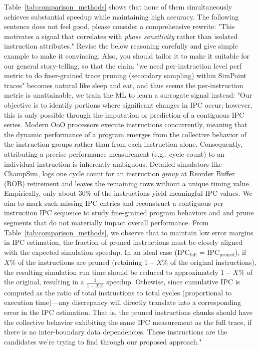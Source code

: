 Table~\ref{tab:comparison_methods} shows that none of them simultaneously achieves substantial speedup while maintaining high accuracy. The following sentence does not feel good, please consider a comprehensive rewrite: "This motivates a signal that correlates with \emph{phase sensitivity} rather than isolated instruction attributes."
Revise the below reasoning carefully and give simple example to make it convincing. Also, you should tailor it to make it suitable for our general story-telling, so that the claim "we need per-instruction level perf metric to do finer-grained trace pruning (secondary sampling) within SimPoint traces" becomes natural like sleep and eat, and thus seems the per-instruction metric is unattainable, we train the ML to learn a surrogate signal instead: "Our objective is to identify portions where significant changes in IPC occur; however, this is only possible through the imputation or prediction of a contiguous IPC series. Modern OoO processors execute instructions concurrently, meaning that the dynamic performance of a program emerges from the collective behavior of the instruction groups rather than from each instruction alone. Consequently, attributing a precise performance measurement (e.g., cycle count) to an individual instruction is inherently ambiguous. Detailed simulators like ChampSim, {logs one cycle count
for an instruction \textit{group} at Reorder Buffer (ROB) retirement and leaves the remaining rows without a unique timing value.} Empirically, only about 30\% of the instructions yield meaningful IPC values.  {We aim to mark such missing IPC entries and reconstruct a contiguous per-instruction IPC sequence to study fine-grained program behaviors} and and prune segments that do not materially impact overall performance.
From Table~\ref{tab:comparison_methods}, we observe that to maintain low error margins in IPC estimation, the fraction of pruned instructions must be closely aligned with the expected simulation speedup. In an ideal case ($\text{IPC}_\text{full}$ = $\text{IPC}_\text{pruned}$), if $X\%$ of the instructions are pruned (retaining $1-X\% $ of the original instructions), the resulting simulation run time should be reduced to approximately  $1-X\%$  of the original, resulting in a $\frac{1}{1-X\%}$ speedup. Othewise, since cumulative IPC is computed as the ratio of total instructions   to total cycles (proportional to execution time)—any discrepancy will directly translate into a corresponding error in the IPC estimation. That is, the pruned instructions chunks should have the collective behavior exhibiting the same IPC measurement as the full trace, if there is no inter-boundary data dependencies. These instructions are the candidates we're trying to find through our proposed approach."

